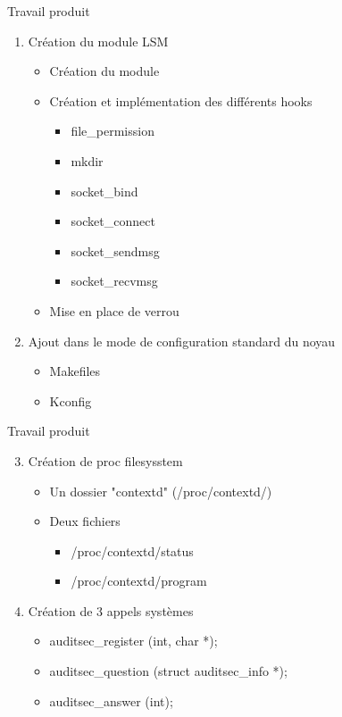 \documentclass{beamer}
\begin{document}
\begin{frame}{Travail produit}
\begin{enumerate}
	\item Création du module LSM \\
	\begin{itemize}
		\item Création du module
		\item Création et implémentation des différents hooks \\
		\begin{itemize}
			\item file\_permission
			\item mkdir
			\item socket\_bind
			\item socket\_connect
			\item socket\_sendmsg
			\item socket\_recvmsg
		\end{itemize}
		\item Mise en place de verrou
	\end{itemize}	
	\item Ajout dans le mode de configuration standard du noyau
		\begin{itemize}
			\item Makefiles
			\item Kconfig
		\end{itemize}
\end{enumerate}
\end{frame}

\begin{frame}{Travail produit}
\begin{enumerate}
\setcounter{enumi}{2}
	\item Création de proc filesysstem \\
	\begin{itemize}
		\item Un dossier "contextd" (/proc/contextd/)
		\item Deux fichiers\
		\begin{itemize}
			\item /proc/contextd/status
			\item /proc/contextd/program
		\end{itemize}
	\end{itemize}
	\item Création de 3 appels systèmes \\
	\begin{itemize}
		\item auditsec\_register (int, char *);
		\item auditsec\_question (struct auditsec\_info *);
		\item auditsec\_answer (int);
	\end{itemize}
\end{enumerate}
\end{frame}
\end{document}
